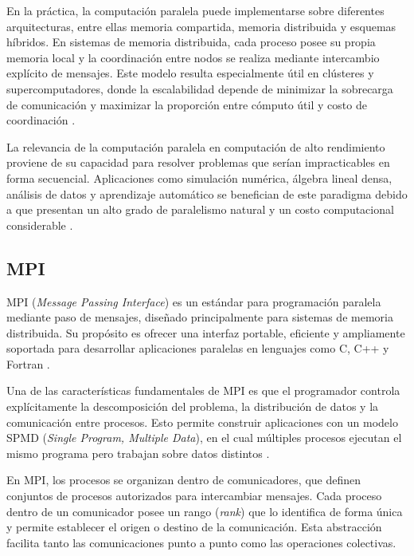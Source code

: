 En la práctica, la computación paralela puede implementarse sobre diferentes arquitecturas, entre ellas memoria compartida, memoria distribuida y esquemas híbridos. En sistemas de memoria distribuida, cada proceso posee su propia memoria local y la coordinación entre nodos se realiza mediante intercambio explícito de mensajes. Este modelo resulta especialmente útil en clústeres y supercomputadores, donde la escalabilidad depende de minimizar la sobrecarga de comunicación y maximizar la proporción entre cómputo útil y costo de coordinación \parencite{hager2010introHPC}.

La relevancia de la computación paralela en computación de alto rendimiento proviene de su capacidad para resolver problemas que serían impracticables en forma secuencial. Aplicaciones como simulación numérica, álgebra lineal densa, análisis de datos y aprendizaje automático se benefician de este paradigma debido a que presentan un alto grado de paralelismo natural y un costo computacional considerable \parencite{patterson2017computer}.

\subsection{MPI}

MPI (\textit{Message Passing Interface}) es un estándar para programación paralela mediante paso de mensajes, diseñado principalmente para sistemas de memoria distribuida. Su propósito es ofrecer una interfaz portable, eficiente y ampliamente soportada para desarrollar aplicaciones paralelas en lenguajes como C, C++ y Fortran \parencite{snir1998mpi2,mpiForum2021}.

Una de las características fundamentales de MPI es que el programador controla explícitamente la descomposición del problema, la distribución de datos y la comunicación entre procesos. Esto permite construir aplicaciones con un modelo SPMD (\textit{Single Program, Multiple Data}), en el cual múltiples procesos ejecutan el mismo programa pero trabajan sobre datos distintos \parencite{gropp2014usingmpi}.

En MPI, los procesos se organizan dentro de comunicadores, que definen conjuntos de procesos autorizados para intercambiar mensajes. Cada proceso dentro de un comunicador posee un rango (\textit{rank}) que lo identifica de forma única y permite establecer el origen o destino de la comunicación. Esta abstracción facilita tanto las comunicaciones punto a punto como las operaciones colectivas.

